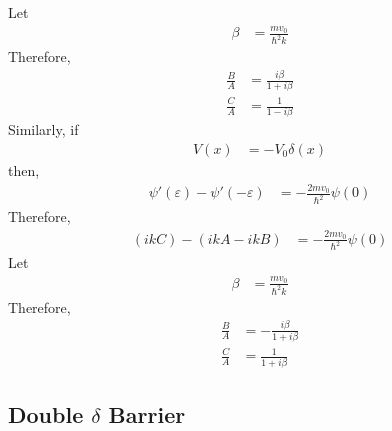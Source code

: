 \documentclass[titlepage, fleqn, a4paper, 12pt, twoside]{article}
\theoremstyle{definition}
\theoremstyle{theorem}
\begin{document}
Let
\begin{align*}
	\beta &= \frac{m v_0}{\hbar^2 k}
\end{align*}
Therefore,
\begin{align*}
	\frac{B}{A} &= \frac{i \beta}{1 + i \beta}\\
	\frac{C}{A} &= \frac{1}{1 - i \beta}
\end{align*}
Similarly, if
\begin{align*}
	V(x) &= -V_0 \delta(x)
\end{align*}
then,
\begin{align*}
	\psi'(\varepsilon) - \psi'(-\varepsilon) &= -\frac{2 m v_0}{\hbar^2} \psi(0)
\end{align*}
Therefore,
\begin{align*}
	(i k C) - (i k A - i k B) &= -\frac{2 m v_0}{\hbar^2} \psi(0)
\end{align*}
Let
\begin{align*}
	\beta &= \frac{m v_0}{\hbar^2 k}
\end{align*}
Therefore,
\begin{align*}
	\frac{B}{A} &= -\frac{i \beta}{1 + i \beta}\\
	\frac{C}{A} &= \frac{1}{1 + i \beta}
\end{align*}

\subsection{Double $\delta$ Barrier}
\end{document}
